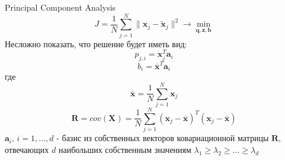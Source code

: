 \documentclass[10pt]{beamer}
\begin{document}
\begin{frame}{Principal Component Analysis}
\[
    J = \frac{1}{N} \sum \limits _{j=1}^N \|\mathbf{x}_j -
    \mathbf{\tilde{x}}_j \|^2 \rightarrow \min \limits _{\mathbf{q},
    \mathbf{z}, \mathbf{b}}
\]
Несложно показать, что решение будет иметь вид:
\[
    p_{j,i} = \mathbf{x}_j^T \mathbf{a}_i
\]
\[
    b_i = \mathbf{\bar{x}}^T \mathbf{a}_i
\]
где
\[
    \mathbf{\bar{x}} = \frac{1}{N} \sum \limits_{j=1}^{N} \mathbf{x}_j
\]
\[
    \mathbf{R} = cov(\mathbf{X}) = \frac{1}{N} \sum \limits_{j=1}^{N} (\mathbf{x}_j - \mathbf{\bar{x}})^T
    (\mathbf{x}_j - \mathbf{\bar{x}})
\]
$\mathbf{a}_i,\, i=1,\ldots,d$ - базис из собственных векторов ковариационной
матрицы $\mathbf{R}$, отвечающих $d$ наибольших собственным значениям $\lambda_1 \ge
\lambda_2 \ge \ldots \ge \lambda_d$
\end{frame}
\end{document}
